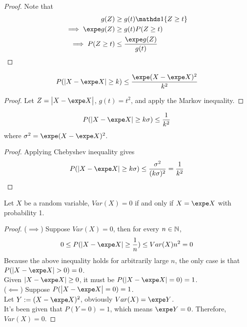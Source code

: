 \documentclass{article}
\begin{document}
   	\begin{proof} Note that
   		\begin{align}
   			g(Z) &\geq g(t) \id{Z \geq t} \\
   			\implies \expe g(Z) &\geq g(t) P(Z \geq t) \\
   			\implies P(Z \geq t) &\leq \frac{\expe g(Z)}{g(t)}
   		\end{align}
   	\end{proof}
   	
   	\begin{corollary}
   		\begin{align}
   			P(|X - \expe X| \geq k) \leq \frac{\expe (X - \expe X)^2}{k^2}
   		\end{align}
   	\end{corollary}
   	
   	\begin{proof}
   		Let $Z = \abs{X - \expe X}$, $g(t) = t^2$, and apply the Markov inequality.
   	\end{proof}
   	
   	\begin{corollary}
   		\begin{align}
   			P(|X - \expe X| \geq k \sigma) \leq \frac{1}{k^2}
   		\end{align}
   		where $\sigma^2 = \expe (X - \expe X)^2$.
   	\end{corollary}
   	
   	\begin{proof}
   		Applying Chebyshev inequality gives
   		\begin{align}
   			P(|X - \expe X| \geq k \sigma) \leq \frac{\sigma^2}{(k \sigma)^2} = \frac{1}{k^2}
   		\end{align}
   	\end{proof}
   	
   	\begin{corollary}
   		Let $X$ be a random variable, $Var(X) = 0$ if and only if $X = \expe X$ with probability 1.
   	\end{corollary}
   	
   	\begin{proof}
   		($\implies$) Suppose $Var(X) = 0$, then for every $n \in \mathbb{N}$,
   		\begin{align}
   			0 \leq P(|X - \expe X| \geq \frac{1}{n}) \leq Var(X) n^2 = 0
   		\end{align}
   		Because the above inequality holds for arbitrarily large $n$, the only case is that $P(|X - \expe X| > 0) = 0$.\\
   		Given $|X - \expe X| \geq 0$, it must be $P(|X - \expe X| = 0) = 1$. \\
   		($\impliedby$) Suppose $P(\abs{X - \expe X} = 0) = 1$. \\
   		Let $Y := (X - \expe X)^2$, obviously $Var(X) = \expe Y$. \\
   		It's been given that $P(Y = 0) = 1$, which means $\expe Y = 0$. Therefore, $Var(X) = 0$.
   	\end{proof}
   	
\end{document}
